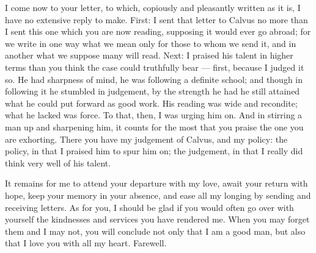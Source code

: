  I come now to your letter, to which, copiously and pleasantly written as it is, I have no extensive reply to make. First: I sent that letter to Calvus no more than I sent this one which you are now reading, supposing it would ever go abroad; for we write in one way what we mean only for those to whom we send it, and in another what we suppose many will read. Next: I praised his talent in higher terms than you think the case could truthfully bear --- first, because I judged it so. He had sharpness of mind, he was following a definite school; and though in following it he stumbled in judgement, by the strength he had he still attained what he could put forward as good work. His reading was wide and recondite; what he lacked was force. To that, then, I was urging him on. And in stirring a man up and sharpening him, it counts for the most that you praise the one you are exhorting. There you have my judgement of Calvus, and my policy: the policy, in that I praised him to spur him on; the judgement, in that I really did think very well of his talent.

 It remains for me to attend your departure with my love, await your return with hope, keep your memory in your absence, and ease all my longing by sending and receiving letters. As for you, I should be glad if you would often go over with yourself the kindnesses and services you have rendered me. When you may forget them and I may not, you will conclude not only that I am a good man, but also that I love you with all my heart. Farewell.
